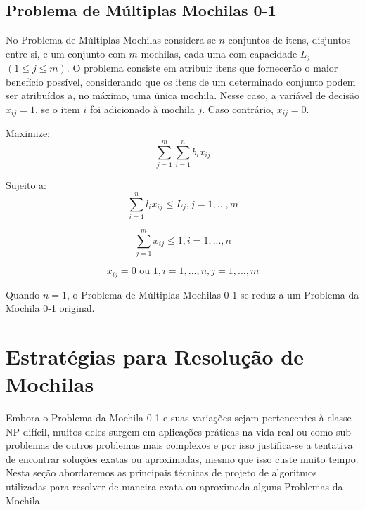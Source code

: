 \subsection{Problema de Múltiplas Mochilas 0-1}

No Problema de Múltiplas Mochilas considera-se $n$ conjuntos de itens, disjuntos entre si, e um conjunto com $m$ mochilas, cada uma com capacidade $L_j$ $(1 \leq j \leq m)$. O problema consiste em atribuir itens que fornecerão o maior benefício possível, considerando que os itens de um determinado conjunto podem ser atribuídos a, no máximo, uma única mochila. Nesse caso, a variável de decisão $x_{ij}=1$, se o item $i$ foi adicionado à mochila $j$. Caso contrário, $x_{ij}=0$. 

\hspace*{3.0cm} Maximize:
\begin{equation}
 \sum_{j=1}^m \sum_{i=1}^n b_i x_{ij} 
\end{equation} 

\hspace*{3.0cm} Sujeito a:
\begin{equation}
 \sum_{i=1}^n l_i x_{ij} \leq L_j, j=1,...,m
\end{equation} 

\begin{equation}
 \sum_{j=1}^m x_{ij} \leq 1, i=1,...,n
\end{equation} 

\begin{equation}
 x_{ij}=0 \textrm{ ou } 1, i=1,...,n , j=1,...,m 
\end{equation} 

Quando $n=1$, o Problema de Múltiplas Mochilas 0-1 se reduz a um Problema da Mochila 0-1 original.


\section{Estratégias para Resolução de Mochilas} \label{cap2_tec_estr}

Embora o Problema da Mochila 0-1 e suas variações sejam pertencentes à classe NP-difícil, muitos deles surgem em aplicações práticas na vida real ou como sub-problemas de outros problemas mais complexos e por isso justifica-se a tentativa de encontrar soluções exatas ou aproximadas, mesmo que isso custe muito tempo. Nesta seção abordaremos as principais técnicas de projeto de algoritmos utilizadas para resolver de maneira exata ou aproximada alguns Problemas da Mochila. 

